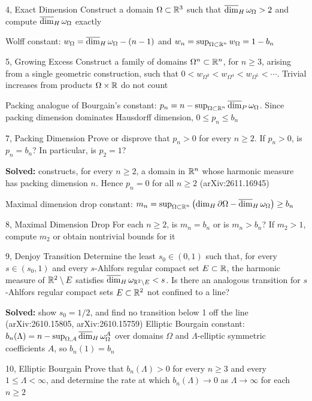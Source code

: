 \begin{challenge}{4, Exact Dimension}
Construct a domain $\Omega\subset\mathbb{R}^3$ such that $\overline{\dim}_H\,\omega_\Omega>2$ and compute $\overline{\dim}_H\,\omega_\Omega$ exactly
\end{challenge}
Wolff constant: $w_\Omega=\overline{\dim}_H\,\omega_\Omega-(n-1)$ and $w_n=\sup_{\Omega\subset\mathbb{R}^n}w_\Omega=1-b_n$
\begin{challenge}{5, Growing Excess}
Construct a family of domains $\Omega^n\subset\mathbb{R}^n$, for $n\geq3$, arising from a single geometric construction, such that $0<w_{\Omega^3}<w_{\Omega^4}<w_{\Omega^5}<\cdots$. Trivial increases from products $\Omega\times\mathbb{R}$ do not count
\end{challenge}
Packing analogue of Bourgain's constant: $p_n=n-\sup_{\Omega\subset\mathbb{R}^n}\overline{\dim}_P\,\omega_\Omega$. Since packing dimension dominates Hausdorff dimension, $0\leq p_n\leq b_n$
\begin{challenge}{7, Packing Dimension}
Prove or disprove that $p_n>0$ for every $n\geq2$. If $p_n>0$, is $p_n=b_n$? In particular, is $p_2=1$?
\end{challenge}
\textcolor{c4}{\textbf{Solved:}}  constructs, for every $n\geq2$, a domain in $\mathbb{R}^n$ whose harmonic measure has packing dimension $n$. Hence $p_n=0$ for all $n\geq2$ \small{(arXiv:2611.16945)}

Maximal dimension drop constant: $m_n=\sup_{\Omega\subset\mathbb{R}^n}\left(\dim_H\partial\Omega-\overline{\dim}_H\,\omega_\Omega\right)\geq b_n$
\begin{challenge}{8, Maximal Dimension Drop}
For each $n\geq2$, is $m_n=b_n$ or is $m_n>b_n$? If $m_2>1$, compute $m_2$ or obtain nontrivial bounds for it
\end{challenge}
\begin{challenge}{9, Denjoy Transition}
Determine the least $s_0\in(0,1)$ such that, for every $s\in(s_0,1)$ and every $s$-Ahlfors regular compact set $E\subset\mathbb{R}$, the harmonic measure of $\mathbb{R}^2\setminus E$ satisfies $\overline{\dim}_H\,\omega_{\mathbb{R}^2\setminus E}<s$. Is there an analogous transition for $s$-Ahlfors regular compact sets $E\subset\mathbb{R}^2$ not confined to a line?
\end{challenge}
\textcolor{c4}{\textbf{Solved:}}  show $s_0=1/2$, and find no transition below 1 off the line \small{(arXiv:2610.15805, arXiv:2610.15759)}
\medskip
Elliptic Bourgain constant: $b_n(\Lambda)=n-\sup_{\Omega,A}\overline{\dim}_H\,\omega^A_\Omega$ over domains $\Omega$ and $\Lambda$-elliptic symmetric coefficients $A$, so $b_n(1)=b_n$
\begin{challenge}{10, Elliptic Bourgain}
Prove that $b_n(\Lambda)>0$ for every $n\geq3$ and every $1\leq\Lambda<\infty$, and determine the rate at which $b_n(\Lambda)\to0$ as $\Lambda\to\infty$ for each $n\geq2$
\end{challenge}
